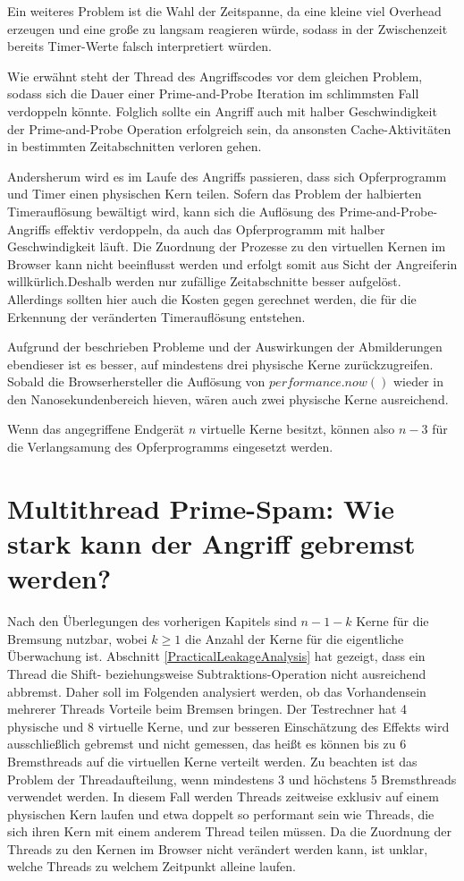 Ein weiteres Problem ist die Wahl der Zeitspanne, da eine kleine viel Overhead erzeugen und eine große zu langsam reagieren würde, sodass in der Zwischenzeit bereits Timer-Werte falsch interpretiert würden.

Wie erwähnt steht der Thread des Angriffscodes vor dem gleichen Problem, sodass sich die Dauer einer Prime-and-Probe Iteration im schlimmsten Fall verdoppeln könnte.
Folglich sollte ein Angriff auch mit halber Geschwindigkeit der Prime-and-Probe Operation erfolgreich sein, da ansonsten Cache-Aktivitäten in bestimmten Zeitabschnitten verloren gehen.

Andersherum wird es im Laufe des Angriffs passieren, dass sich Opferprogramm und Timer einen physischen Kern teilen.
Sofern das Problem der halbierten Timerauflösung bewältigt wird, kann sich die Auflösung des Prime-and-Probe-Angriffs effektiv verdoppeln, da auch das Opferprogramm mit halber Geschwindigkeit läuft.
Die Zuordnung der Prozesse zu den virtuellen Kernen im Browser kann nicht beeinflusst werden und erfolgt somit aus Sicht der Angreiferin willkürlich.Deshalb werden nur zufällige Zeitabschnitte besser aufgelöst.
Allerdings sollten hier auch die Kosten gegen gerechnet werden, die für die Erkennung der veränderten Timerauflösung entstehen.

Aufgrund der beschrieben Probleme und der Auswirkungen der Abmilderungen ebendieser ist es besser, auf mindestens drei physische Kerne zurückzugreifen.
Sobald die Browserhersteller die Auflösung von $performance.now()$ wieder in den Nanosekundenbereich hieven, wären auch zwei physische Kerne ausreichend. 

Wenn das angegriffene Endgerät $n$ virtuelle Kerne besitzt, können also $n-3$ für die Verlangsamung des Opferprogramms eingesetzt werden.

\section{Multithread Prime-Spam: Wie stark kann der Angriff gebremst werden?}
\label{MoreIsBetter}

Nach den Überlegungen des vorherigen Kapitels sind $n-1-k$ Kerne für die Bremsung nutzbar, wobei $k \geq 1$ die Anzahl der Kerne für die eigentliche Überwachung ist. 
Abschnitt \ref{PracticalLeakageAnalysis} hat gezeigt, dass ein Thread die Shift- beziehungsweise Subtraktions-Operation nicht ausreichend abbremst.
Daher soll im Folgenden analysiert werden, ob das Vorhandensein mehrerer Threads Vorteile beim Bremsen bringen.
Der Testrechner hat 4 physische und 8 virtuelle Kerne, und zur besseren Einschätzung des Effekts wird ausschließlich gebremst und nicht gemessen, das heißt es können bis zu 6 Bremsthreads auf die virtuellen Kerne verteilt werden.
Zu beachten ist das Problem der Threadaufteilung, wenn mindestens 3 und höchstens 5 Bremsthreads verwendet werden.
In diesem Fall werden Threads zeitweise exklusiv auf einem physischen Kern laufen und etwa doppelt so performant sein wie Threads, die sich ihren Kern mit einem anderem Thread teilen müssen.
Da die Zuordnung der Threads zu den Kernen im Browser nicht verändert werden kann, ist unklar, welche Threads zu welchem Zeitpunkt alleine laufen.

